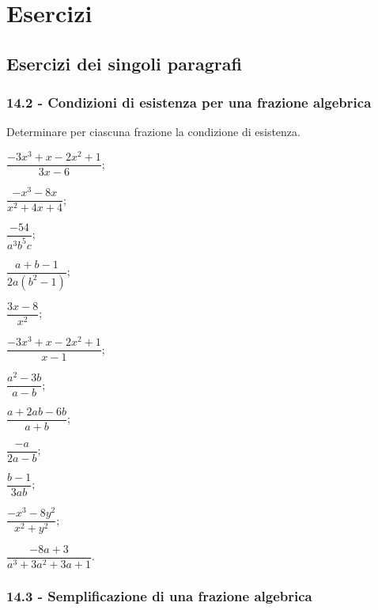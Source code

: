 
\section{Esercizi}
\subsection{Esercizi dei singoli paragrafi}
\subsubsection*{14.2 - Condizioni di esistenza per una frazione algebrica}

\begin{esercizio}
\label{ese:14.1}
Determinare per ciascuna frazione la condizione di esistenza.
\begin{multicols}{3}
\begin{enumeratea}
 \item $\dfrac{-3x^{3}+x-2x^{2}+1}{3x-6}$;
 \item $\dfrac{-x^{3}-8x}{x^{2}+4x+4}$;
 \item $\dfrac{-54}{a^{3}b^{5}c}$;
 \item $\dfrac{a+b-1}{2a \left(b^{2}-1\right)}$;
 \item $\dfrac{3x-8}{x^{2}}$;
 \item $\dfrac{-3x^{3}+x-2x^{2}+1}{x-1}$;
 \item $\dfrac{a^{{2}}-3b}{a-b}$;
 \item $\dfrac{a+2ab-6b}{a+b}$;
 \item $\dfrac{-a}{2a-b}$;
 \item $\dfrac{b-1}{3ab}$;
 \item $\dfrac{-x^{{3}}-8y^{{2}}}{x^{{2}}+y^{{2}}}$;
 \item $\dfrac{-8a+3}{a^{3}+3a^{2}+3a+1}$.
\end{enumeratea}
\end{multicols}
\end{esercizio}

\subsubsection*{14.3 - Semplificazione di una frazione algebrica}

